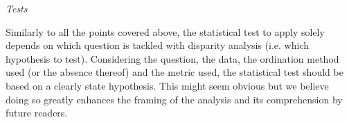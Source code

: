\documentclass[12pt,letterpaper]{article}
\renewcommand{\subsection}[1]{%
\bigskip
\begin{center}
\begin{large}
\normalfont\itshape #1
\end{large}
\end{center}}
\begin{document}


\subsection{Tests}
Similarly to all the points covered above, the statistical test to apply solely depends on which question is tackled with disparity analysis (i.e. which hypothesis to test).
Considering the question, the data, the ordination method used (or the absence thereof) and the metric used, the statistical test should be based on a clearly state hypothesis.
This might seem obvious but we believe doing so greatly enhances the framing of the analysis and its comprehension by future readers.
\end{document}
